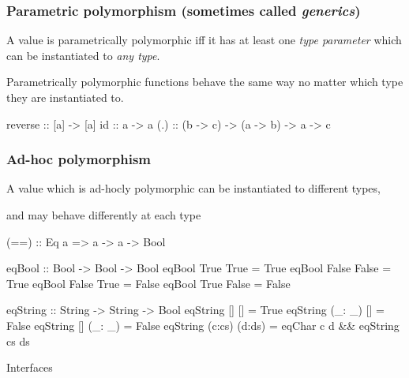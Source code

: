 \documentclass[usenames,dvipsnames,svgnames,table,aspectratio=169,mathserif]{beamer}
\newcommand{\nl}{\vspace{\baselineskip}}
\newcommand{\pnl}{\pause \nl}
\begin{document}
\begin{frame}[fragile]

\frametitle{Parametric polymorphism (sometimes called {\it generics})}

A value is parametrically polymorphic iff it has at least one {\it type parameter}
which can be instantiated to {\it any type}.

\nl

Parametrically polymorphic functions behave the same way no matter which type
they are instantiated to.

\pnl

\begin{haskellcode}
reverse :: [a] -> [a]
id :: a -> a
(.) :: (b -> c) -> (a -> b) -> a -> c
\end{haskellcode}

\end{frame}


\begin{frame}[fragile]
\frametitle{Ad-hoc polymorphism}

A value which is ad-hocly polymorphic can be instantiated to different types,

and may behave differently at each type

\end{frame}


\begin{frame}[fragile]

\begin{haskellcode}
(==) :: Eq a => a -> a -> Bool
\end{haskellcode}

\pnl

\begin{haskellcode}
eqBool :: Bool -> Bool -> Bool
eqBool True True   = True
eqBool False False = True
eqBool False True  = False
eqBool True False  = False
\end{haskellcode}

\pnl

\begin{haskellcode}
eqString :: String -> String -> Bool
eqString []      []     = True
eqString (_: _)  []     = False
eqString []      (_: _) = False
eqString (c:cs)  (d:ds) = eqChar c d && eqString cs ds
\end{haskellcode}

\end{frame}


\begin{frame}
\begin{center}
\huge{Interfaces}
\end{center}
\end{frame}
\end{document}
